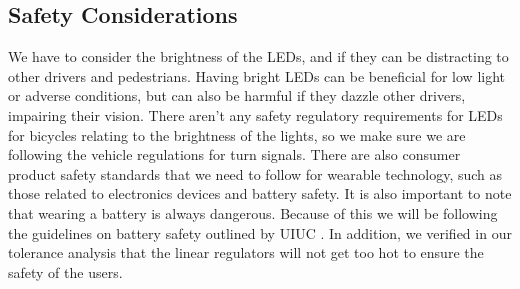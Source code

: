 \subsection{Safety Considerations}
We have to consider the brightness of the LEDs, and if they can be distracting to other drivers and pedestrians. Having bright LEDs can be beneficial for low light or adverse conditions, but can also be harmful if they dazzle other drivers, impairing their vision. There aren’t any safety regulatory requirements for LEDs for bicycles relating to the brightness of the lights, so we make sure we are following the vehicle regulations for turn signals. \cite{CFR571_108} There are also consumer product safety standards that we need to follow for wearable technology, such as those related to electronics devices and battery safety. It is also important to note that wearing a battery is always dangerous. Because of this we will be following the guidelines on battery safety outlined by UIUC \cite{UIUCBatterySafety2023}. In addition, we verified in our tolerance analysis that the linear regulators will not get too hot to ensure the safety of the users.